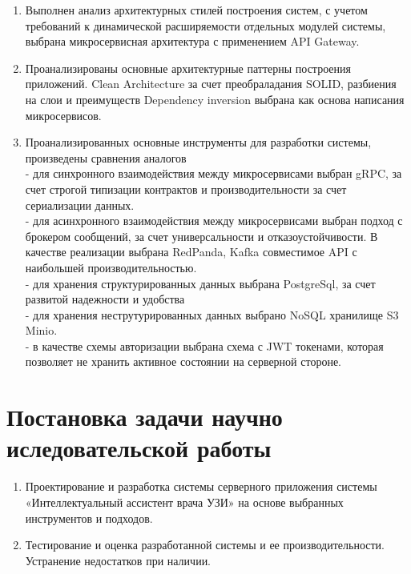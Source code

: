 \begin{enumerate}
	\item Выполнен анализ архитектурных стилей построения систем, с учетом требований к динамической расширяемости отдельных модулей системы, выбрана микросервисная архитектура с применением API Gateway.
	\item Проанализированы основные архитектурные паттерны построения приложений. Clean Architecture за счет преобраладания SOLID, разбиения на слои и преимуществ Dependency inversion выбрана как основа написания микросервисов.
	\item Проанализированных основные инструменты для разработки системы, произведены сравнения аналогов\\
        - для синхронного взаимодействия между микросервисами выбран gRPC, за счет строгой типизации контрактов и производительности за счет сериализации данных.\\
        - для асинхронного взаимодействия между микросервисами выбран подход с брокером сообщений, за счет универсальности и отказоустойчивости. В качестве реализации выбрана RedPanda, Kafka совместимое API с наибольшей производительностью.\\
        - для хранения структурированных данных выбрана PostgreSql, за счет развитой надежности и удобства\\
        - для хранения неструтурированных данных выбрано NoSQL хранилище S3 Minio.\\
        - в качестве схемы авторизации выбрана схема с JWT токенами, которая позволяет не хранить активное состоянии на серверной стороне.\\
\end{enumerate}



\section{Постановка задачи научно иследовательской работы}
\begin{enumerate}
	\item Проектирование и разработка системы серверного приложения системы «Интеллектуальный ассистент врача УЗИ» на основе выбранных инструментов и подходов.
	\item Тестирование и оценка разработанной системы и ее производительности. Устранение недостатков при наличии.
\end{enumerate}


